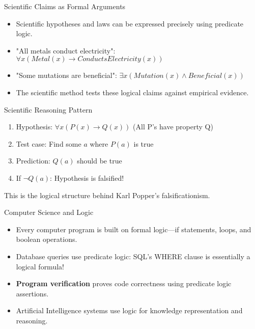 \documentclass{beamer}
\begin{document}
	\begin{frame}{Scientific Claims as Formal Arguments}
		\begin{itemize}
			\item Scientific hypotheses and laws can be expressed precisely using predicate logic.
			\item "All metals conduct electricity": $\forall x (Metal(x) \rightarrow ConductsElectricity(x))$
			\item "Some mutations are beneficial": $\exists x (Mutation(x) \wedge Beneficial(x))$
			\item The scientific method tests these logical claims against empirical evidence.
		\end{itemize}
		
		\begin{block}{Scientific Reasoning Pattern}
			\begin{enumerate}
				\item Hypothesis: $\forall x (P(x) \rightarrow Q(x))$ (All P's have property Q)
				\item Test case: Find some $a$ where $P(a)$ is true
				\item Prediction: $Q(a)$ should be true
				\item If $\neg Q(a)$: Hypothesis is falsified!
			\end{enumerate}
			This is the logical structure behind Karl Popper's falsificationism.
		\end{block}
	\end{frame}
	
	\begin{frame}{Computer Science and Logic}
		\begin{itemize}
			\item Every computer program is built on formal logic—if statements, loops, and boolean operations.
			\item Database queries use predicate logic: SQL's WHERE clause is essentially a logical formula!
			\item \textbf{Program verification} proves code correctness using predicate logic assertions.
			\item Artificial Intelligence systems use logic for knowledge representation and reasoning.
		\end{itemize}
		
	\end{frame}
	
\end{document}
